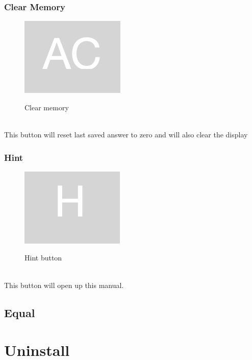 \documentclass[11pt, a4paper]{article}
\begin{document}
    \subsubsection{Clear Memory}
    \label{subsubsec:clearmemory}

    \begin{figure}[h]
        \caption{Clear memory}
        \includegraphics[scale = 0.2]{clear_memory}
        \centering
        \label{fig:c}
    \end{figure}
    \\
    This button will reset last saved answer to zero and will also clear the display

    \subsubsection[scale = 0.2]{Hint}
    \label{subsubsec:hint}


    \begin{figure}[h]
        \caption{Hint button}
        \includegraphics[scale = 0.2]{hint}
        \centering
        \label{fig:h}
    \end{figure}
    \\
    This button will open up this manual.

    \newpage

    \subsection{Equal}
    \label{subsec:equal}


    \section{Uninstall}
    \label{sec:uninstall}
\end{document}
